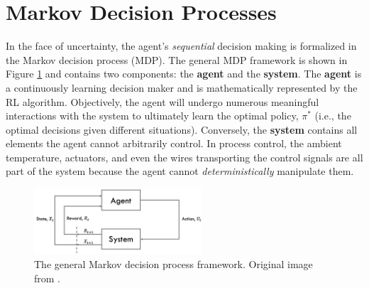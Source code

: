 %
%

\section{Markov Decision Processes}
In the face of uncertainty, the agent's \textit{sequential} decision making is formalized in the Markov decision process (MDP). The general MDP framework is shown in Figure \ref{fig:01mdp} and contains two components: the \textbf{agent} and the \textbf{system}. The \textbf{agent} is a continuously learning decision maker and is mathematically represented by the RL algorithm. Objectively, the agent will undergo numerous meaningful interactions with the system to ultimately learn the optimal policy, $\pi^*$ (i.e., the optimal decisions given different situations). Conversely, the \textbf{system} contains all elements the agent cannot arbitrarily control. In process control, the ambient temperature, actuators, and even the wires transporting the control signals are all part of the system because the agent cannot \textit{deterministically} manipulate them. 

\begin{figure}[H]
    \centering
    \includegraphics[width=0.56\textwidth]{images/ch1/MDP.jpeg}
    \caption{The general Markov decision process framework. Original image from \cite{sutton}.}
    \label{fig:01mdp}
\end{figure}   

